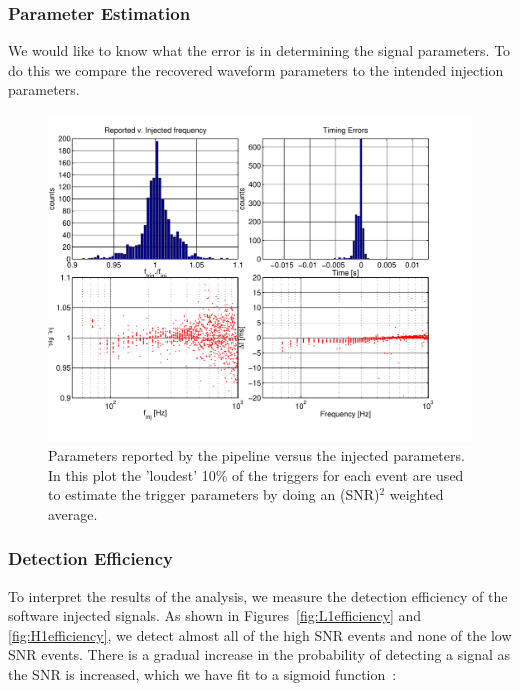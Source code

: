 \subsubsection{Parameter Estimation}
\label{sec:ParamEst}

We would like to know what the error is in determining the signal parameters.
To do this we compare the recovered waveform parameters to the intended
injection parameters.

\begin{figure}[!h]
\centerline{\includegraphics[angle=0,width=6.5in]{Figures/Chap7/ParamEst-Ave.pdf}}
\caption[Parameter Estimation]{Parameters reported by the pipeline versus the 
         injected parameters. In this plot the 'loudest' 10\% of the triggers
         for each event are used to estimate the trigger parameters by doing 
         an (SNR)$^2$ weighted average.}
\label{fig:ParamEst}
\end{figure}


\subsubsection{Detection Efficiency}

To interpret the results of the analysis, we measure the detection efficiency
of the software injected signals. As shown
in Figures~\ref{fig:L1efficiency} and \ref{fig:H1efficiency}, we detect almost 
all of the high SNR events and none of the low SNR
events. There is a gradual increase in the probability of detecting a signal
as the SNR is increased, which we have fit to a sigmoid function~\cite{S1:Bursts}:

